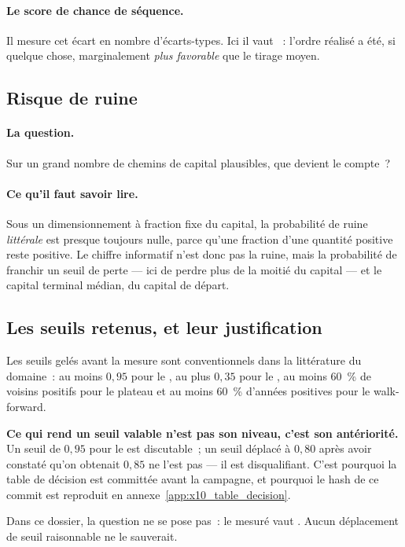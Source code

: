 \paragraph{Le score de chance de séquence.} Il mesure cet écart en nombre
d'écarts-types. Ici il vaut \XTenSequenceZ~: l'ordre réalisé a été, si
quelque chose, marginalement \emph{plus favorable} que le tirage moyen.

\subsection{Risque de ruine}

\paragraph{La question.} Sur un grand nombre de chemins de capital plausibles,
que devient le compte~?

\paragraph{Ce qu'il faut savoir lire.} Sous un dimensionnement à fraction fixe
du capital, la probabilité de ruine \emph{littérale} est presque toujours
nulle, parce qu'une fraction d'une quantité positive reste positive. Le
chiffre informatif n'est donc pas la ruine, mais la probabilité de franchir
un seuil de perte --- ici \XTenLossFiftyProb{} de perdre plus de la moitié du
capital --- et le capital terminal médian, \XTenTerminalMedian{} du capital de
départ.

\subsection{Les seuils retenus, et leur justification}

Les seuils gelés avant la mesure sont conventionnels dans la littérature du
domaine~: au moins $0{,}95$ pour le , au plus $0{,}35$ pour le
, au moins 60~\% de voisins positifs pour le plateau et au moins
60~\% d'années positives pour le walk-forward.

\begin{insightbox}
\textbf{Ce qui rend un seuil valable n'est pas son niveau, c'est son
antériorité.} Un seuil de $0{,}95$ pour le  est discutable~; un
seuil déplacé à $0{,}80$ après avoir constaté qu'on obtenait $0{,}85$ ne l'est
pas --- il est disqualifiant. C'est pourquoi la table de décision est
committée avant la campagne, et pourquoi le hash de ce commit est reproduit
en annexe~\ref{app:x10_table_decision}.

Dans ce dossier, la question ne se pose pas~: le  mesuré vaut
\XTenDSR. Aucun déplacement de seuil raisonnable ne le sauverait.
\end{insightbox}

